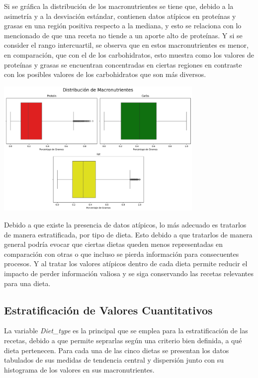 \documentclass[12pt,a4paper]{article}
\begin{document}
    Si se gráfica la distribución de los macronutrientes se tiene que, debido 
    a la asimetría y a la desviación estándar, contienen datos atípicos en proteínas y grasas en una región 
    positiva respecto a la mediana, y esto se relaciona con lo mencionado de que 
    una receta no tiende a un aporte alto de proteínas. Y si se consider el rango 
    intercuartil, se observa que en estos macronutrientes es menor, en comparación, 
    que con el de los carbohidratos, esto muestra como los valores de proteínas y 
    grasas se encuentran concentradas en ciertas regiones en contraste con los posibles 
    valores de los carbohidratos que son más diversos.
    \begin{center}
        \includegraphics[width=0.75\textwidth]{Resources/2_02_plot_01.png}
    \end{center}

    Debido a que existe la presencia de datos atípicos, lo más adecuado es tratarlos 
    de manera estratificada, por tipo de dieta. Esto debido a que tratarlos de manera 
    general podría evocar que ciertas dietas queden menos representadas en comparación 
    con otras o que incluso se pierda información para consecuentes procesos. Y al 
    tratar los valores atípicos dentro de cada dieta permite reducir el impacto de 
    perder información valiosa y se siga conservando las recetas relevantes para una dieta.

    \subsection{Estratificación de Valores Cuantitativos}
    La variable \emph{Diet\_type} es la principal que se emplea para la 
    estratificación de las recetas, debido a que permite seprarlas 
    según una criterio bien definida, a qué dieta pertenecen. Para cada 
    una de las cinco dietas se presentan los datos tabulados de sus 
    medidas de tendencia central y dispersión junto con su histograma 
    de los valores en sus macronutrientes.\\
\end{document}

